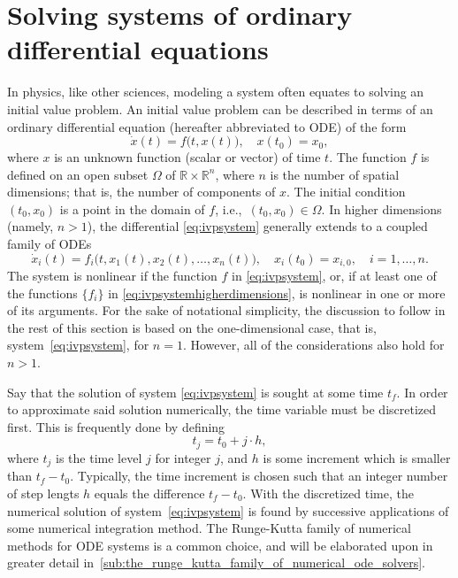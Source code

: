 \section[Solving systems of ordinary differential equations]%
{Solving systems of ordinary differential eq\hspace{0em}uations}%
\label{sec:solvingsystems}

In physics, like other sciences, modeling a system often equates to solving an
initial value problem. An initial value problem can be described in terms of an
ordinary differential equation (hereafter abbreviated to ODE) of the form
\begin{equation}
    \label{eq:ivpsystem}
    \dot{x}(t) = f\big(t,x(t)\big), \quad x(t_{0}) = x_{0},
\end{equation}
where $x$ is an unknown function (scalar or vector) of time $t$. The function
$f$ is defined on an open subset $\Omega$ of $\mathbb{R}\times\mathbb{R}^{n}$,
where $n$ is the number of spatial dimensions; that is, the number of components
of $x$. The initial condition $(t_{0},x_{0})$ is a point in the domain of $f$,
i.e.,\ $(t_{0},x_{0})\in\Omega$. In higher dimensions (namely, $n>1$), the
differential \cref{eq:ivpsystem} generally extends to a coupled family of ODEs
\begin{equation}
    \label{eq:ivpsystemhigherdimensions}
    \dot{x}_{i}(t) = f_{i}\big(t,x_{1}(t),x_{2}(t),\ldots,x_{n}(t)\big),%
    \quad x_{i}(t_{0}) = x_{i,0}, \quad i = 1,\ldots,n.
\end{equation}
The system is nonlinear if the function $f$ in \cref{eq:ivpsystem}, or, if at
least one of the functions $\{f_{i}\}$ in \cref{eq:ivpsystemhigherdimensions},
is nonlinear in one or more of its arguments. For the sake of notational
simplicity, the discussion to follow in the rest of this section is based
on the one-dimensional case, that is, system~\eqref{eq:ivpsystem}, for $n=1$.
However, all of the considerations also hold for $n>1$.

Say that the solution of system \eqref{eq:ivpsystem} is sought at some time
$t_{f}$. In order to approximate said solution numerically, the time variable
must be discretized first. This is frequently done by defining
\begin{equation}
    \label{eq:discretime}
    t_{j} = t_{0}+j\cdot{}h,
\end{equation}
where $t_{j}$ is the time level $j$ for integer $j$, and $h$ is some increment
which is smaller than $t_{f}-t_{0}$. Typically, the time increment is chosen
such that an integer number of step lengts $h$ equals the difference
$t_{f}-t_{0}$. With the discretized time, the numerical solution of
system~\eqref{eq:ivpsystem} is found by successive applications of some
numerical integration method. The Runge-Kutta family of numerical methods for
ODE systems is a common choice, and will be elaborated upon in greater detail
in~\cref{sub:the_runge_kutta_family_of_numerical_ode_solvers}.

